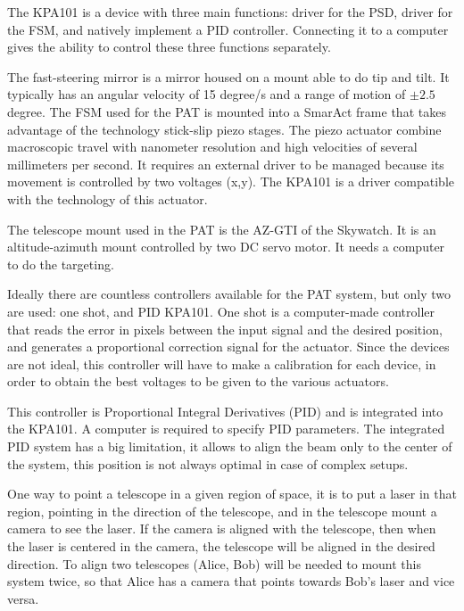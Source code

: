 The KPA101 is a device with three main functions: driver for the PSD, driver for the FSM, and natively implement a PID controller. Connecting it to a computer gives the ability to control these three functions separately.


The fast-steering mirror is a mirror housed on a mount able to do tip and tilt. It typically has an angular velocity of 15 degree/s and a range of motion of $\pm 2.5$ degree.
The FSM used for the PAT is mounted into a SmarAct frame that takes advantage of the technology stick-slip piezo stages. The piezo actuator combine macroscopic travel with nanometer resolution and high velocities of several millimeters per second.
It requires an external driver to be managed because its movement is controlled by two voltages (x,y). The KPA101 is a driver compatible with the technology of this actuator.

The telescope mount used in the PAT is the AZ-GTI of the Skywatch. It is an altitude-azimuth mount controlled by two DC servo motor. It needs a computer to do the targeting.

Ideally there are countless controllers available for the PAT system, but only two are used: one shot, and PID KPA101.
One shot is a computer-made controller that reads the error in pixels between the input signal and the desired position, and generates a proportional correction signal for the actuator.
Since the devices are not ideal, this controller will have to make a calibration for each device, in order to obtain the best voltages to be given to the various actuators.

This controller is Proportional Integral Derivatives (PID) and is integrated into the KPA101. A computer is required to specify PID parameters. The integrated PID system has a big limitation, it allows to align the beam only to the center of the system, this position is not always optimal in case of complex setups.

One way to point a telescope in a given region of space, it is to put a laser in that region, pointing in the direction of the telescope, and in the telescope mount a camera to see the laser.
If the camera is aligned with the telescope, then when the laser is centered in the camera, the telescope will be aligned in the desired direction.
To align two telescopes (Alice, Bob) will be needed to mount this system twice, so that Alice has a camera that points towards Bob’s laser and vice versa.

